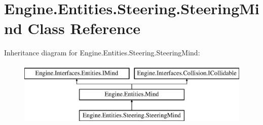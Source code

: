 \hypertarget{a00346}{}\section{Engine.\+Entities.\+Steering.\+Steering\+Mind Class Reference}
\label{a00346}
Inheritance diagram for Engine.\+Entities.\+Steering.\+Steering\+Mind\+:\begin{figure}[H]
\begin{center}
\leavevmode
\includegraphics[height=3.000000cm]{d2/daf/a00346}
\end{center}
\end{figure}

